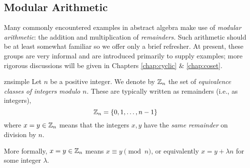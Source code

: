 \clearpage


\subsection{Modular Arithmetic}\label{sec:modarith}

Many commonly encountered examples in abstract algebra make use of \emph{modular arithmetic}: the addition and multiplication of \emph{remainders.} Such arithmetic should be at least somewhat familiar so we offer only a brief refresher. At present, these groups are very informal and are introduced primarily to supply examples; more rigorous discussions will be given in Chapters \ref{chap:cyclic} \& \ref{chap:coset}.


\begin{defn}{}{znsimple}
	Let $n$ be a positive integer. We denote by $\mathbb{Z}_n$ the set of \emph{equivalence classes of integers modulo $n$.} These are typically written as remainders (i.e., as integers),
	\[
		\mathbb{Z}_n=\{0,1,\ldots,n-1\}
	\]
	where $x=y\in\mathbb{Z}_n$ means that the integers $x,y$ have the \emph{same remainder} on division by $n$.
\end{defn}

More formally,\footnotemark{} $x=y\in\mathbb{Z}_n$ means $x\equiv y\pmod n$, or equivalently $x=y+\lambda n$ for some integer $\lambda$.


